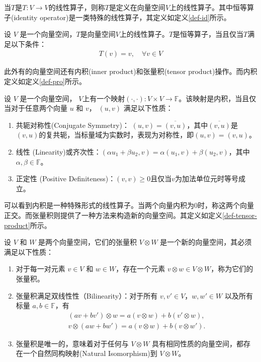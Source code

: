 当$T$是\(T: V \rightarrow V\)的线性算子，则称$T$是定义在向量空间$V$上的线性算子。其中恒等算子(identity operator)是一类特殊的线性算子，其定义如定义\ref{def-id}所示。
\begin{definition}\citep{greub2012linear}
    \label{def-id}
    设 \(V\) 是一个向量空间，$T$是向量空间$V$上的线性算子。$T$是恒等算子，当且仅当$T$满足以下条件：
    \begin{align}
        T(v) = v,\quad \forall v \in V
    \end{align}
\end{definition}

此外有的向量空间还有内积(inner product)和张量积(tensor product)操作。而内积定义如定义\ref{def-pro}所示。
\begin{definition}\citep{greub2012linear}
    \label{def-pro}
    设 \(V\) 是一个向量空间，
    \(V\)上有一个映射\(( \cdot, \cdot ): V \times V \rightarrow \mathbb{F}\)。该映射是内积，当且仅当对于任意两个向量 $u$ 和 $v$， $( u, v )$ 满足以下性质：
\begin{enumerate}
    \item 共轭对称性(Conjugate Symmetry)： \(( u, v ) = \overline{( v, u )}\)，其中\(\overline{( v, u )}\)是\(( v, u )\)的复共轭，当标量域为实数时，表现为对称性，即\(( u, v ) = ( v, u )\)。
    \item 线性 (Linearity)或齐次性：\(( \alpha u_1 + \beta u_2, v ) = \alpha( u_1, v ) + \beta( u_2, v )\)，其中\(\alpha,\beta\in\mathbb{F}\)。
    \item 正定性 (Positive Definiteness)：\(( v, v ) \geq 0\)且仅当\(v \)为加法单位元时等号成立。
\end{enumerate}
\end{definition}
可以看到内积是一种特殊形式的线性算子。当两个向量内积为$0$时，称这两个向量正交。而张量积则提供了一种方法来构造新的向量空间。其定义如定义\ref{def-tensor-product}所示。
\begin{definition}\citep{greub2012linear}
    \label{def-tensor-product}
    设 \(V\) 和 \(W\) 是两个向量空间，它们的张量积 \(V \otimes W\) 是一个新的向量空间，其必须满足以下性质：
\begin{enumerate}
    \item 对于每一对元素 \(v \in V\) 和 \(w \in W\)，存在一个元素 \(v \otimes w \in V \otimes W\)，称为它们的张量积。
    \item 张量积满足双线性性（Bilinearity）：对于所有 \(v,v' \in V\)，\(w,w' \in W\) 以及所有标量 \(a,b \in \mathbb{F}\)，有
    \begin{align}
    (av + bv') \otimes w = a(v \otimes w) + b(v' \otimes w),\\
    v \otimes (aw + bw') = a(v \otimes w) + b(v \otimes w').
    \end{align}
    \item 张量积是唯一的，意味着对于任何与 \(V \otimes W\) 具有相同性质的向量空间，都存在一个自然同构映射(Natural Isomorphism)到 \(V \otimes W\)。
\end{enumerate}
\end{definition}


